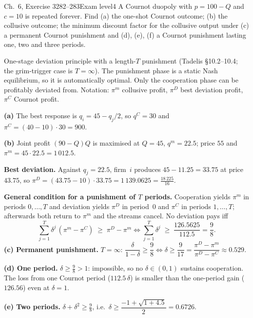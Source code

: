 \begin{exsol}{\MG{} Ch.~6, Exercise 3}{282--283}{Exam level}{4}
\asked A Cournot duopoly with $p = 100 - Q$ and $c = 10$ is repeated forever. Find (a) the one-shot Cournot
outcome; (b) the collusive outcome; the minimum discount factor for the collusive output under (c) a
permanent Cournot punishment and (d), (e), (f) a Cournot punishment lasting one, two and three periods.

\method One-stage deviation principle with a length-$T$ punishment (Tadelis \S10.2--10.4; the grim-trigger
case is $T = \infty$). The punishment phase is a static Nash equilibrium, so it is automatically optimal. Only
the cooperation phase can be profitably deviated from. Notation: $\pi^m$ collusive profit, $\pi^D$ best
deviation profit, $\pi^C$ Cournot profit.

\solution
\textbf{(a)} The best response is $q_i = 45 - q_j/2$, so $q^C = 30$ and $\pi^C = (40 - 10)\cdot 30 = 900$.

\textbf{(b)} Joint profit $(90 - Q)Q$ is maximised at $Q = 45$, $q^m = 22.5$; price $55$ and $\pi^m = 45\cdot
22.5 = 1\,012.5$.

\textbf{Best deviation.} Against $q_j = 22.5$, firm~$i$ produces $45 - 11.25 = 33.75$ at price $43.75$, so
$\pi^D = (43.75 - 10)\cdot 33.75 = 1\,139.0625 = \frac{18\,225}{16}$.

\textbf{General condition for a punishment of $T$ periods.} Cooperation yields $\pi^m$ in periods $0,\dots,T$
and deviation yields $\pi^D$ in period~0 and $\pi^C$ in periods $1,\dots,T$; afterwards both return to $\pi^m$
and the streams cancel. No deviation pays iff
\[
  \sum_{j=1}^{T}\delta^j\,(\pi^m - \pi^C) \;\ge\; \pi^D - \pi^m
  \iff \sum_{j=1}^{T}\delta^j \;\ge\; \frac{126.5625}{112.5} = \frac98 .
\]
\textbf{(c) Permanent punishment.} $T = \infty$: $\dfrac{\delta}{1-\delta} \ge \dfrac98 \iff \delta \ge
\dfrac{9}{17} = \dfrac{\pi^D - \pi^m}{\pi^D - \pi^C} \approx 0.529$.

\textbf{(d) One period.} $\delta \ge \frac98 > 1$: impossible, so no $\delta \in (0,1)$ sustains cooperation.
The loss from one Cournot period ($112.5\,\delta$) is smaller than the one-period gain ($126.56$) even at
$\delta = 1$.

\textbf{(e) Two periods.} $\delta + \delta^2 \ge \frac98$, i.e.\ $\delta \ge \dfrac{-1 + \sqrt{1 + 4.5}}{2} =
0.6726$.


\end{exsol}
